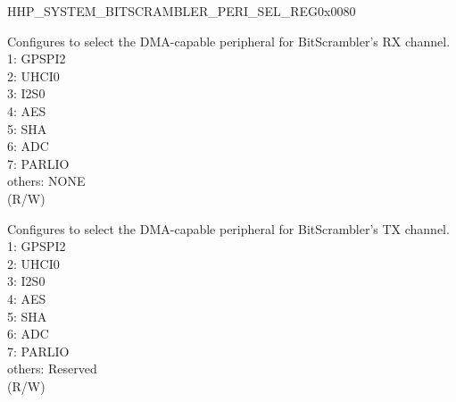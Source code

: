 \begin{register}{H}{HP\_SYSTEM\_BITSCRAMBLER\_PERI\_SEL\_REG}{0x0080}\label{regdesc:HPSYSTEMBITSCRAMBLERPERISELREG}
%
%
%
\regnewline%
\begin{regdesc}\begin{reglist}
\label{fielddesc:HPSYSTEMBITSCRAMBLERRXSEL}\item [HP\_SYSTEM\_BITSCRAMBLER\_RX\_SEL] Configures to select the DMA-capable peripheral for BitScrambler's RX channel.\\
1: GPSPI2 \\
2: UHCI0 \\
3: I2S0 \\
4: AES \\
5: SHA \\
6: ADC \\
7: PARLIO \\
others: NONE\\
(R/W)
\label{fielddesc:HPSYSTEMBITSCRAMBLERTXSEL}\item [HP\_SYSTEM\_BITSCRAMBLER\_TX\_SEL] Configures to select the DMA-capable peripheral for BitScrambler's TX channel.\\
1: GPSPI2 \\
2: UHCI0 \\
3: I2S0 \\
4: AES \\
5: SHA \\
6: ADC \\
7: PARLIO \\
others: Reserved\\
(R/W)
\end{reglist}\end{regdesc}
\end{register}


